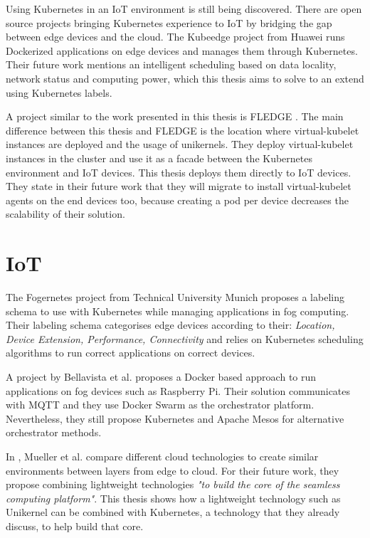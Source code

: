 Using Kubernetes in an IoT environment is still being discovered. There are open source projects bringing Kubernetes experience to IoT by bridging the gap between edge devices and the cloud. The Kubeedge project \cite{kubeedge} from Huawei runs Dockerized applications on edge devices and manages them through Kubernetes. Their future work mentions an intelligent scheduling based on data locality, network status and computing power, which this thesis aims to solve to an extend using Kubernetes labels.

A project similar to the work presented in this thesis is FLEDGE \cite{fledge}. The main difference between this thesis and FLEDGE is the location where virtual-kubelet instances are deployed and the usage of unikernels. They deploy virtual-kubelet instances in the cluster and use it as a facade between the Kubernetes environment and IoT devices. This thesis deploys them directly to IoT devices. They state in their future work that they will migrate to install virtual-kubelet agents on the end devices too, because creating a pod per device decreases the scalability of their solution.

\section*{IoT}
The Fogernetes project \cite{fogernetes} from Technical University Munich proposes a labeling schema to use with Kubernetes while managing applications in fog computing. Their labeling schema categorises edge devices according to their: \textit{Location, Device Extension, Performance, Connectivity} and relies on Kubernetes scheduling algorithms to run correct applications on correct devices.

A project by Bellavista et al. \cite{Bellavista2017} proposes a Docker based approach to run applications on fog devices such as Raspberry Pi. Their solution communicates with MQTT and they use Docker Swarm as the orchestrator platform. Nevertheless, they still propose Kubernetes and Apache Mesos for alternative orchestrator methods.

In \cite{Mueller2017}, Mueller et al. compare different cloud technologies to create similar environments between layers from edge to cloud. For their future work, they propose combining lightweight technologies \textit{"to build the core of the seamless computing platform"}. This thesis shows how a lightweight technology such as Unikernel can be combined with Kubernetes, a technology that they already discuss, to help build that core.

